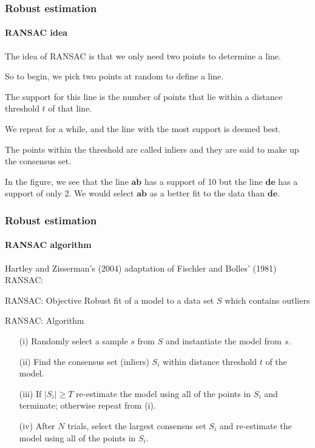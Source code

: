 \documentclass[aspectratio=169]{beamer}
\renewcommand{\vec}[1]{\boldsymbol{#1}}
\begin{document}
\begin{frame}
\frametitle{Robust estimation}
\framesubtitle{RANSAC idea}

The idea of RANSAC is that we only need two points to determine a
line.

\medskip

So to begin, we pick two points \alert{at random} to define a line.

\medskip

The \alert{support} for this line is the number of points that lie
within a distance threshold $t$ of that line.

\medskip

We repeat for a while, and the \alert{line with the most support} is
deemed best.

\medskip

The points within the threshold are called \alert{inliers} and they
are said to make up the \alert{consensus set}.

\medskip

In the figure, we see that the line $\overline{\vec{a}\vec{b}}$ has a
support of 10 but the line $\overline{\vec{d}\vec{e}}$ has a support
of only 2.  We would select $\overline{\vec{a}\vec{b}}$ as a better
fit to the data than $\overline{\vec{d}\vec{e}}$.

\end{frame}

\begin{frame}
\frametitle{Robust estimation}
\framesubtitle{RANSAC algorithm}

Hartley and Zisserman's (2004) adaptation of Fischler and Bolles'
(1981) RANSAC:

\begin{block}{RANSAC: Objective}
Robust fit of a model to a data set $S$ which contains outliers
\end{block}

\begin{block}{RANSAC: Algorithm}
\begin{itemize}
\item[(i)] Randomly select a sample $s$ from $S$ and instantiate the
  model from $s$.
\item[(ii)] Find the consensus set (inliers) $S_i$ within distance
  threshold $t$ of the model.
\item[(iii)] If $|S_i|\ge T$ re-estimate the model using all of the
  points in $S_i$ and terminate; otherwise repeat from (i).
\item [(iv)] After $N$ trials, select the largest consensus set $S_i$
  and re-estimate the model using all of the points in $S_i$.
\end{itemize}
\end{block}

\end{frame}
\end{document}
